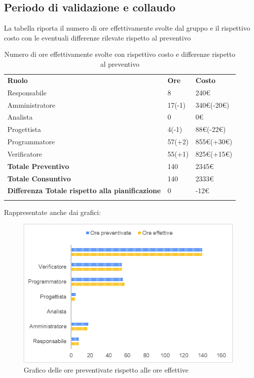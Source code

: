 \subsection{Periodo di validazione e collaudo}
La tabella riporta il numero di ore effettivamente svolte dal gruppo e il rispettivo costo con le eventuali differenze rilevate rispetto al preventivo
\begin{longtable} {							
		>{}p{96mm}  
		>{}p{16mm}
		>{}p{16mm}			
	}			
	\rowcolor{gray!50}
	
	\textbf{Ruolo}            & \textbf{Ore} & \textbf{Costo}       \TBstrut \\
	Responsabile              & 8            & 240\euro             \TBstrut \\
	Amministratore            & 17(-1)       & 340\euro(-20\euro)   \TBstrut \\
	Analista                  & 0            & 0\euro               \TBstrut \\
	Progettista               & 4(-1)        & 88\euro(-22\euro)    \TBstrut \\
	Programmatore             & 57(+2)       & 855\euro(+30\euro)   \TBstrut \\
	Verificatore              & 55(+1)       & 825\euro(+15\euro)   \TBstrut \\
	\textbf{Totale Preventivo}& 140          & 2345\euro            \TBstrut \\	
	\textbf{Totale Consuntivo}& 140          & 2333\euro            \TBstrut \\	
	\textbf{Differenza Totale rispetto alla pianificazione}& 0           & -12\euro              \TBstrut \\
	\rowcolor{white}
	\caption{Numero di ore effettivamente svolte con rispettivo costo e differenze rispetto al preventivo}	
\end{longtable}

Rappresentate anche dai grafici:
\begin{figure} [H]
	\includegraphics[width=\linewidth]{./img/Grafici/ra-consuntivo1.png}
	\caption{Grafico delle ore preventivate rispetto alle ore effettive}
\end{figure}

